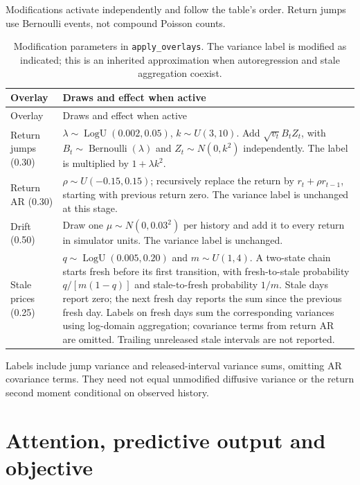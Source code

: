 Modifications activate independently and follow the table's order. Return jumps use Bernoulli events, not compound Poisson counts.

\begin{longtable}{@{}>{\raggedright\arraybackslash}p{2.0cm}>{\raggedright\arraybackslash}p{11.8cm}@{}}
\caption[Broad-prior modification draws]{Modification parameters in \texttt{apply\_overlays}. The variance label is modified as indicated; this is an inherited approximation when autoregression and stale aggregation coexist.}\label{tab:prior-overlay-draws}\\
\toprule Overlay & Draws and effect when active \\
\midrule
\endfirsthead
\toprule Overlay & Draws and effect when active \\
\midrule
\endhead
Return jumps (0.30) & $\lambda\sim\operatorname{LogU}(0.002,0.05)$, $k\sim U(3,10)$. Add $\sqrt{v_t}B_t Z_t$, with $B_t\sim\operatorname{Bernoulli}(\lambda)$ and $Z_t\sim N(0,k^2)$ independently. The label is multiplied by $1+\lambda k^2$. \\
Return AR (0.30) & $\rho\sim U(-0.15,0.15)$; recursively replace the return by $r_t+\rho r_{t-1}$, starting with previous return zero. The variance label is unchanged at this stage. \\
Drift (0.50) & Draw one $\mu\sim N(0,0.03^2)$ per history and add it to every return in simulator units. The variance label is unchanged. \\
Stale prices (0.25) & $q\sim\operatorname{LogU}(0.005,0.20)$ and $m\sim U(1,4)$. A two-state chain starts fresh before its first transition, with fresh-to-stale probability $q/[m(1-q)]$ and stale-to-fresh probability $1/m$. Stale days report zero; the next fresh day reports the sum since the previous fresh day. Labels on fresh days sum the corresponding variances using log-domain aggregation; covariance terms from return AR are omitted. Trailing unreleased stale intervals are not reported. \\
\bottomrule
\end{longtable}

Labels include jump variance and released-interval variance sums, omitting AR covariance terms. They need not equal unmodified diffusive variance or the return second moment conditional on observed history.

\section{Attention, predictive output and objective}

